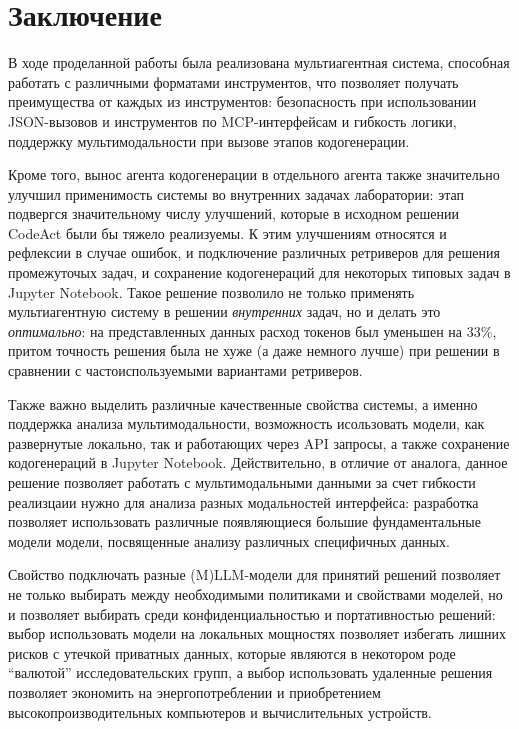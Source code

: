 \chapter*{Заключение} \label{ch-conclusion}

В ходе проделанной работы была реализована мультиагентная система, способная работать с различными 
форматами инструментов, что позволяет получать преимущества от каждых из инструментов: безопасность при
использовании JSON-вызовов и инструментов по MCP-интерфейсам и гибкость логики, поддержку мультимодальности
при вызове этапов кодогенерации.

Кроме того, вынос агента кодогенерации в отдельного агента также значительно улучшил применимость системы
во внутренних задачах лаборатории: этап подвергся значительному числу улучшений, которые в исходном решении
CodeAct были бы тяжело реализуемы. К этим улучшениям относятся и рефлексии в случае ошибок, и подключение
различных ретриверов для решения промежуточых задач, и сохранение кодогенераций для некоторых типовых задач
в Jupyter Notebook. Такое решение позволило не только применять мультиагентную систему в решении 
\textit{внутренних} задач, но и делать это \textit{оптимально}: на представленных данных расход токенов
был уменьшен на 33\%, притом точность решения была не хуже (а даже немного лучше) при решении в сравнении
с частоиспользуемыми вариантами ретриверов.

Также важно выделить различные качественные свойства системы, а именно поддержка анализа мультимодальности,
возможность исользовать модели, как развернутые локально, так и работающих через API запросы,
а также сохранение кодогенераций в Jupyter Notebook.
Действительно, в отличие от аналога, данное решение позволяет работать с мультимодальными данными
за счет гибкости реализцаии нужно для анализа разных модальностей интерфейса: разработка
позволяет использовать различные появляющиеся большие фундаментальные модели модели, посвященные анализу
различных специфичных данных. 

Свойство подключать разные (M)LLM-модели для принятий решений позволяет не только выбирать между необходимыми
политиками и свойствами моделей, но и позволяет выбирать среди конфиденциальностью и портативностью решений:
выбор использовать модели на локальных мощностях позволяет избегать лишних рисков с утечкой приватных данных,
которые являются в некотором роде ``валютой'' исследовательских групп, а выбор использовать удаленные решения
позволяет экономить на энергопотреблении и приобретением высокопроизводительных компьютеров и вычислительных 
устройств.

